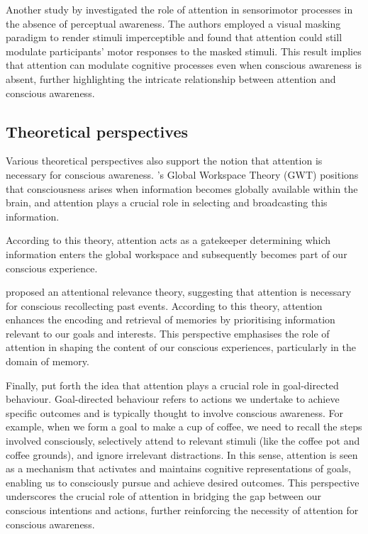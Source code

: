 \documentclass[10pt]{article}
\begin{document}
\begin{sloppypar}
  Another study by \cite{sumner_attentional_2006} investigated the role of attention in sensorimotor processes in the absence of perceptual awareness. The authors employed a visual masking paradigm to render stimuli imperceptible and found that attention could still modulate participants’ motor responses to the masked stimuli. This result implies that attention can modulate cognitive processes even when conscious awareness is absent, further highlighting the intricate relationship between attention and conscious awareness.

  \subsection{Theoretical perspectives}
  \label{sec:theoretical}

  Various theoretical perspectives also support the notion that attention is necessary for conscious awareness. \citeauthor{baars_essential_1997} ’s \citeyearpar{baars_essential_1997} Global Workspace Theory (GWT) positions that consciousness arises when information becomes globally available within the brain, and attention plays a crucial role in selecting and broadcasting this information.

  According to this theory, attention acts as a gatekeeper determining which information enters the global workspace and subsequently becomes part of our conscious experience.

  \cite{de_brigard_role_2012} proposed an attentional relevance theory, suggesting that attention is necessary for conscious recollecting past events. According to this theory, attention enhances the encoding and retrieval of memories by prioritising information relevant to our goals and interests. This perspective emphasises the role of attention in shaping the content of our conscious experiences, particularly in the domain of memory.

  Finally, \cite{dijksterhuis_goals_2010} put forth the idea that attention plays a crucial role in goal-directed behaviour. Goal-directed behaviour refers to actions we undertake to achieve specific outcomes and is typically thought to involve conscious awareness. For example, when we form a goal to make a cup of coffee, we need to recall the steps involved consciously, selectively attend to relevant stimuli (like the coffee pot and coffee grounds), and ignore irrelevant distractions. In this sense, attention is seen as a mechanism that activates and maintains cognitive representations of goals, enabling us to consciously pursue and achieve desired outcomes. This perspective underscores the crucial role of attention in bridging the gap between our conscious intentions and actions, further reinforcing the necessity of attention for conscious awareness.


\end{sloppypar}
\end{document}
